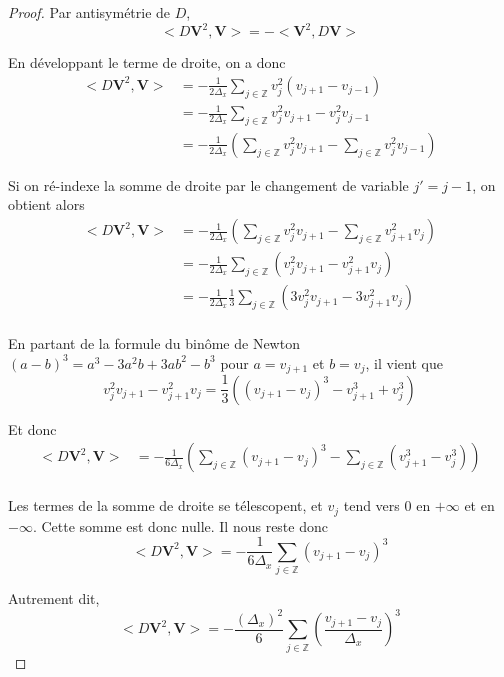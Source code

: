 \documentclass[12pt,a4paper]{article}
\numberwithin{equation}{section}
\begin{document}
\begin{proof}
    
    Par antisymétrie de $D$, 
    $$<D \textbf{V}^2 ,\textbf{V}> = -< \textbf{V}^2 ,D\textbf{V}>$$

    En développant le terme de droite, on a donc
    \begin{equation*}
        \begin{split}
            <D \textbf{V}^2 ,\textbf{V}> &= -\frac{1}{2\Delta_x}\sum\limits_{j\in\mathbb{Z}}v_j^2(v_{j+1}-v_{j-1})\\
            &= -\frac{1}{2\Delta_x}\sum\limits_{j\in\mathbb{Z}}v_j^2v_{j+1}-v_j^2v_{j-1}\\
            &= -\frac{1}{2\Delta_x}\left(\sum\limits_{j\in\mathbb{Z}}v_j^2v_{j+1} - \sum\limits_{j\in\mathbb{Z}}v_j^2v_{j-1}\right)
        \end{split}
    \end{equation*}

    Si on ré-indexe la somme de droite par le changement de variable $j'  = j-1$, on obtient alors
    \begin{equation*}
        \begin{split}
            <D \textbf{V}^2 ,\textbf{V}> &= -\frac{1}{2\Delta_x}\left(\sum\limits_{j\in\mathbb{Z}}v_j^2v_{j+1} - \sum\limits_{j\in\mathbb{Z}}v_{j+1}^2v_{j}\right)\\
            &= -\frac{1}{2\Delta_x}\sum\limits_{j\in\mathbb{Z}}(v_j^2v_{j+1} - v_{j+1}^2v_{j})\\
            &= -\frac{1}{2\Delta_x}\frac{1}{3}\sum\limits_{j\in\mathbb{Z}}(3v_j^2v_{j+1} - 3v_{j+1}^2v_{j})\\
        \end{split}
    \end{equation*}

    En partant de la formule du binôme de Newton  $(a-b)^3 = a^3 - 3a^2b + 3ab^2 - b^3$ pour $a = v_{j+1}$ et $b = v_j$, il vient que 
    $$v_j^2v_{j+1} - v_{j+1}^2v_{j} = \frac{1}{3}\left( (v_{j+1} - v_j)^3 - v_{j+1}^3 + v_j^3\right)$$

    Et donc
    \begin{equation*}
        \begin{split}
            <D \textbf{V}^2 ,\textbf{V}> &= -\frac{1}{6\Delta_x}\left(\sum\limits_{j\in\mathbb{Z}}(v_{j+1} - v_j)^3 - \sum\limits_{j\in\mathbb{Z}}(v_{j+1}^3 - v_j^3)\right)\\
        \end{split}
    \end{equation*}

    Les termes de la somme de droite se télescopent, et $v_j$ tend vers 0 en $+\infty$ et en $-\infty$. Cette somme est donc nulle. Il nous reste donc
    $$<D \textbf{V}^2 ,\textbf{V}> = -\frac{1}{6\Delta_x}\sum\limits_{j\in\mathbb{Z}}(v_{j+1} - v_j)^3$$
    
    Autrement dit,
    $$<D \textbf{V}^2 ,\textbf{V}> = -\frac{(\Delta_x)^2}{6}\sum\limits_{j\in\mathbb{Z}}\left(\frac{v_{j+1} - v_j}{\Delta_x}\right)^3$$
\end{proof}
\end{document}
